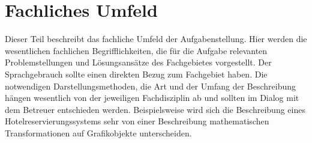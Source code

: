 
\chapter{Fachliches Umfeld} %

\label{ch:fachlichesUmfeld} %


Dieser Teil beschreibt das fachliche Umfeld der Aufgabenstellung. Hier werden
die wesentlichen fachlichen Begrifflichkeiten, die für die Aufgabe relevanten
Problemstellungen und Lösungsansätze des Fachgebietes vorgestellt. Der
Sprachgebrauch sollte einen direkten Bezug zum Fachgebiet haben. Die
notwendigen Darstellungsmethoden, die Art und der Umfang der Beschreibung
hängen wesentlich von der jeweiligen Fachdisziplin ab und sollten im Dialog mit
dem Betreuer entschieden werden. Beispielsweise wird sich die Beschreibung
eines Hotelreservierungssystems sehr von einer Beschreibung mathematischen
Transformationen auf Grafikobjekte unterscheiden.
